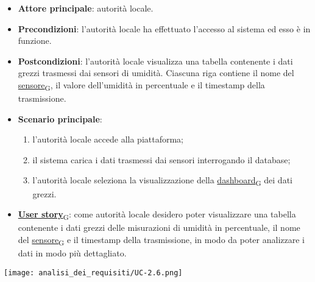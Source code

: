 \begin{itemize}
	\item \textbf{Attore principale}: autorità locale.
	\item \textbf{Precondizioni}: l'autorità locale ha effettuato l'accesso al sistema ed esso è in funzione.
	\item \textbf{Postcondizioni}: l'autorità locale visualizza una tabella contenente i dati grezzi trasmessi dai sensori di umidità.
	      Ciascuna riga contiene il nome del \href{https://7last.github.io/docs/pb/documentazione-interna/glossario\#sensore}{sensore\textsubscript{G}}, il valore dell'umidità in percentuale e il timestamp della trasmissione.
	\item \textbf{Scenario principale}:
	      \begin{enumerate}
		      \item l'autorità locale accede alla piattaforma;
		      \item il sistema carica i dati trasmessi dai sensori interrogando il database;
		      \item l'autorità locale seleziona la visualizzazione della \href{https://7last.github.io/docs/pb/documentazione-interna/glossario\#dashboard}{dashboard\textsubscript{G}} dei dati grezzi.
	      \end{enumerate}
	\item \href{https://7last.github.io/docs/pb/documentazione-interna/glossario\#user-story}{\textbf{User story}\textsubscript{G}}:
	      come autorità locale desidero poter visualizzare una tabella contenente i dati grezzi delle misurazioni di umidità in percentuale,
	      il nome del \href{https://7last.github.io/docs/pb/documentazione-interna/glossario\#sensore}{sensore\textsubscript{G}} e il timestamp della trasmissione, in modo da poter analizzare i dati in modo più dettagliato.
\end{itemize}
\begin{center}
	\texttt{[image: analisi\_dei\_requisiti/UC-2.6.png]}
\end{center}

